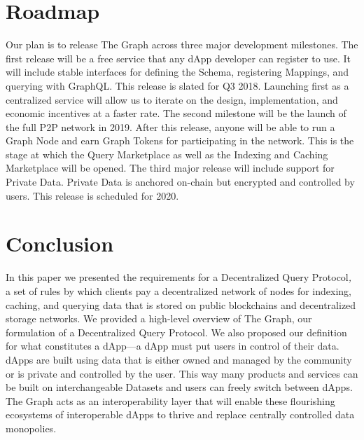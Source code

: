 \documentclass[12pt]{article}
\begin{document}
\section{Roadmap}

Our plan is to release The Graph across three major development milestones. The
first release will be a free service that any dApp developer can register to
use. It will include stable interfaces for defining the Schema, registering
Mappings, and querying with GraphQL. This release is slated for Q3 2018.
Launching first as a centralized service will allow us to iterate on the design,
implementation, and economic incentives at a faster rate. The second milestone
will be the launch of the full P2P network in 2019. After this release, anyone
will be able to run a Graph Node and earn Graph Tokens for participating in the
network. This is the stage at which the Query Marketplace as well as the
Indexing and Caching Marketplace will be opened. The third major release will
include support for Private Data. Private Data is anchored on-chain but
encrypted and controlled by users. This release is scheduled for 2020.

\section{Conclusion}

In this paper we presented the requirements for a Decentralized Query
Protocol\textit{,} a set of rules by which clients pay a decentralized network
of nodes for indexing, caching, and querying data that is stored on public
blockchains and decentralized storage networks. We provided a high-level
overview of The Graph, our formulation of a Decentralized Query Protocol. We
also proposed our definition for what constitutes a dApp---a dApp must put users
in control of their data. dApps are built using data that is either owned and
managed by the community or is private and controlled by the user. This way many
products and services can be built on interchangeable Datasets and users can
freely switch between dApps. The Graph acts as an interoperability layer that
will enable these flourishing ecosystems of interoperable dApps to thrive and
replace centrally controlled data monopolies.
\end{document}
